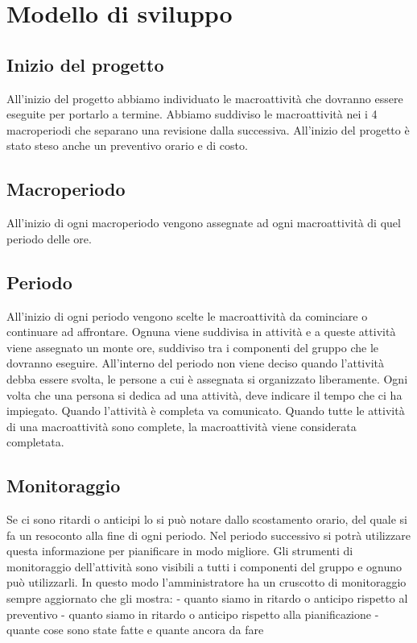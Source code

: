 \section{Modello di sviluppo}

\subsection{Inizio del progetto}
All'inizio del progetto abbiamo individuato le macroattività che dovranno essere eseguite per portarlo a termine.
Abbiamo suddiviso le macroattività nei i 4 macroperiodi che separano una revisione dalla successiva.
All'inizio del progetto è stato steso anche un preventivo orario e di costo.
\subsection{Macroperiodo}
All'inizio di ogni macroperiodo vengono assegnate ad ogni macroattività di quel periodo delle ore.
\subsection{Periodo}
All'inizio di ogni periodo vengono scelte le macroattività da cominciare o continuare ad affrontare.
Ognuna viene suddivisa in attività e a queste attività viene assegnato un monte ore, suddiviso tra i componenti del gruppo che le dovranno eseguire.
All'interno del periodo non viene deciso quando l'attività debba essere svolta, le persone a cui è assegnata si organizzato liberamente.
Ogni volta che una persona si dedica ad una attività, deve indicare il tempo che ci ha impiegato.
Quando l'attività è completa va comunicato.
Quando tutte le attività di una macroattività sono complete, la macroattività viene considerata completata.

\subsection{Monitoraggio}
Se ci sono ritardi o anticipi lo si può notare dallo scostamento orario, del quale si fa un resoconto alla fine di ogni periodo. Nel periodo successivo si potrà utilizzare questa informazione per pianificare in modo migliore.
Gli strumenti di monitoraggio dell'attività sono visibili a tutti i componenti del gruppo e ognuno può utilizzarli. In questo modo l'amministratore ha un cruscotto di monitoraggio sempre aggiornato che gli mostra:
- quanto siamo in ritardo o anticipo rispetto al preventivo
- quanto siamo in ritardo o anticipo rispetto alla pianificazione
- quante cose sono state fatte e quante ancora da fare